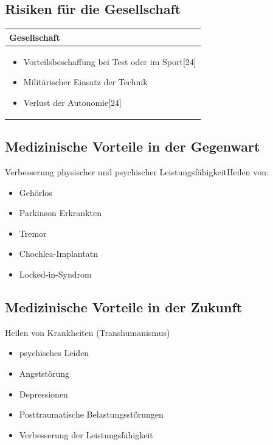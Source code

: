 \documentclass[aspectratio=169,16pt,xcolor=table]{beamer}
\begin{document}
\subsection{Risiken für die Gesellschaft}
\begin{frame} %
\centering
\renewcommand{\arraystretch}{1.5} %
\begin{tabular}{|p{12cm}|}
    \hline
    \rowcolor{blue!25}
    \textbf{Gesellschaft} \\
    \hline
    \begin{itemize}
        \item Vorteilsbeschaffung bei Test oder im Sport[24]
        \item Militärischer Einsatz der Technik
        \item Verlust der Autonomie[24]
    \end{itemize} \\
    \hline
\end{tabular}

\end{frame}




\subsection{Medizinische Vorteile in der Gegenwart}
\begin{frame} %
Verbesserung physischer und psychischer Leistungsfähigkeit\newline Heilen von:
	\begin{itemize}
		\item{Gehörlos}
		\item{Parkinson Erkrankten}
		\item{Tremor}
            \item{Chochlea-Implantatn}
            \item{Locked-in-Syndrom}
        \end{itemize}
\end{frame}



\subsection{Medizinische Vorteile in der Zukunft}
\begin{frame} %
Heilen von Krankheiten (Transhumanismus)
	\begin{itemize}
		\item{psychisches Leiden}
		\item{Angststörung}
		\item{Depressionen}
            \item{Posttraumatische Belastungsstörungen}
            \item{Verbesserung der Leistungsfähigkeit}
        \end{itemize}
\end{frame}
\end{document}
